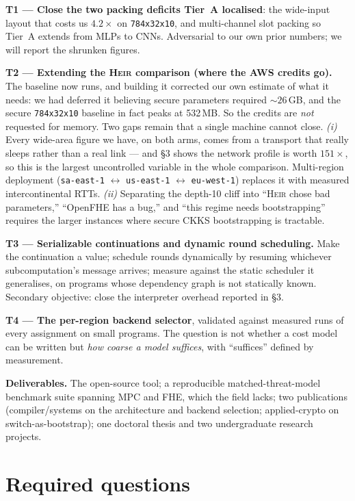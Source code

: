 \documentclass[10pt]{article}
\newcommand{\heir}{\textsc{Heir}}
\begin{document}
\noindent\textbf{T1 --- Close the two packing deficits Tier~A localised}: the
wide-input layout that costs us $4.2\times$ on \texttt{784x32x10}, and
multi-channel slot packing so Tier~A extends from MLPs to CNNs. Adversarial to
our own prior numbers; we will report the shrunken figures.

\noindent\textbf{T2 --- Extending the \heir{} comparison (where the AWS
credits go).} The baseline now runs, and building it corrected our own estimate
of what it needs: we had deferred it believing secure parameters required
${\sim}26$\,GB, and the secure \texttt{784x32x10} baseline in fact peaks at
532\,MB. So the credits are \emph{not} requested for memory. Two gaps remain
that a single machine cannot close. \emph{(i)} Every wide-area figure we have,
on both arms, comes from a transport that really sleeps rather than a real link
--- and §3 shows the network profile is worth $151\times$, so this is the
largest uncontrolled variable in the whole comparison. Multi-region deployment
(\texttt{sa-east-1} $\leftrightarrow$ \texttt{us-east-1} $\leftrightarrow$
\texttt{eu-west-1}) replaces it with measured intercontinental RTTs.
\emph{(ii)} Separating the depth-10 cliff into ``\heir{} chose bad
parameters,'' ``OpenFHE has a bug,'' and ``this regime needs bootstrapping''
requires the larger instances where secure CKKS bootstrapping is tractable.

\noindent\textbf{T3 --- Serializable continuations and dynamic round scheduling.}
Make the continuation a value; schedule rounds dynamically by resuming whichever
subcomputation's message arrives; measure against the static scheduler it
generalises, on programs whose dependency graph is not statically known.
Secondary objective: close the interpreter overhead reported in §3.

\noindent\textbf{T4 --- The per-region backend selector}, validated against
measured runs of every assignment on small programs. The question is not whether
a cost model can be written but \emph{how coarse a model suffices}, with
``suffices'' defined by measurement.

\noindent\textbf{Deliverables.} The open-source tool; a reproducible
matched-threat-model benchmark suite spanning MPC and FHE, which the field
lacks; two publications (compiler/systems on the architecture and backend
selection; applied-crypto on switch-as-bootstrap); one doctoral thesis and two undergraduate research projects.

\section{Required questions}
\end{document}
